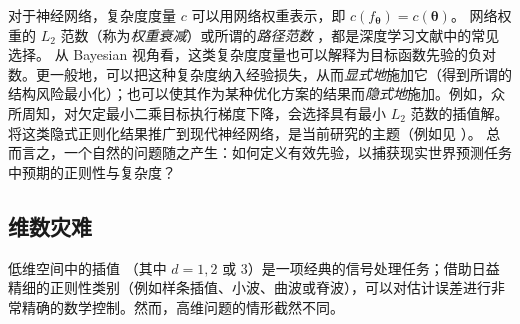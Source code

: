 

对于神经网络，复杂度度量 $c$ 可以用网络权重表示，即 $c(f_{\boldsymbol{\theta}}) = {c}(\boldsymbol{\theta})$。
%
网络权重的 $L_2$ 范数（称为\emph{权重衰减}）或所谓的\emph{路径范数} \citep{neyshabur2015norm}，都是深度学习文献中的常见选择。
%
%
从 Bayesian 视角看，这类复杂度度量也可以解释为目标函数先验的负对数。更一般地，可以把这种复杂度纳入经验损失，从而\emph{显式地}施加它（得到所谓的结构风险最小化）；也可以使其作为某种优化方案的结果而\emph{隐式地}施加。例如，众所周知，对欠定最小二乘目标执行梯度下降，会选择具有最小 $L_2$ 范数的插值解。将这类隐式正则化结果推广到现代神经网络，是当前研究的主题（例如见 \cite{blanc2020implicit, shamir2020implicit, razin2020implicit, gunasekar2017implicit}）。
总而言之，一个自然的问题随之产生：如何定义有效先验，以捕获现实世界预测任务中预期的正则性与复杂度？




\subsection{维数灾难}

低维空间中的插值%
（其中 $d=1,2$ 或 $3$）是一项经典的信号处理任务；借助日益精细的正则性类别（例如样条插值、小波、曲波或脊波），可以对估计误差进行非常精确的数学控制。然而，高维问题的情形截然不同。
%



